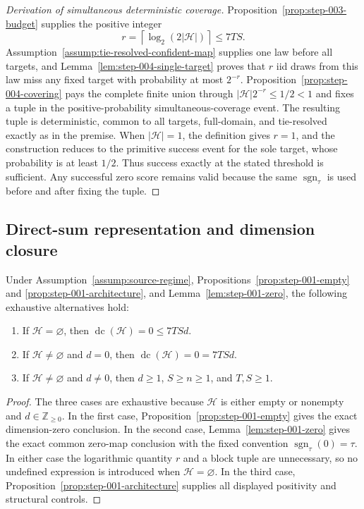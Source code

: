 \begin{proof}[Derivation of simultaneous deterministic coverage]
Proposition~\ref{prop:step-003-budget} supplies the positive integer
\[
r=\left\lceil\log_2(2|\mathcal H|)\right\rceil\leq7TS.
\]
Assumption~\ref{assump:tie-resolved-confident-map} supplies one law before all
targets, and Lemma~\ref{lem:step-004-single-target} proves that $r$ iid draws
from this law miss any fixed target with probability at most $2^{-r}$.
Proposition~\ref{prop:step-004-covering} pays the complete finite union through
$|\mathcal H|2^{-r}\leq1/2<1$ and fixes a tuple in the positive-probability
simultaneous-coverage event.  The resulting tuple is deterministic, common to
all targets, full-domain, and tie-resolved exactly as in the premise.
When $|\mathcal H|=1$, the definition gives $r=1$, and the construction
reduces to the primitive success event for the sole target, whose probability
is at least $1/2$.  Thus success exactly at the stated threshold is sufficient.
Any successful zero score remains valid because the same
$\operatorname{sgn}_{\tau}$ is used before and after fixing the tuple.
\end{proof}

\subsection{Direct-sum representation and dimension closure}
\label{app:step-005}

\begin{proposition}
\label{prop:step-005-routing}
Under Assumption~\ref{assump:source-regime},
Propositions~\ref{prop:step-001-empty} and
\ref{prop:step-001-architecture}, and Lemma~\ref{lem:step-001-zero}, the
following exhaustive alternatives hold:
\begin{enumerate}
\item If $\mathcal H=\varnothing$, then
$\operatorname{dc}(\mathcal H)=0\leq7TSd$.
\item If $\mathcal H\neq\varnothing$ and $d=0$, then
$\operatorname{dc}(\mathcal H)=0=7TSd$.
\item If $\mathcal H\neq\varnothing$ and $d\neq0$, then
$d\geq1$, $S\geq n\geq1$, and $T,S\geq1$.
\end{enumerate}
\end{proposition}

\begin{proof}
The three cases are exhaustive because $\mathcal H$ is either empty or
nonempty and $d\in\mathbb Z_{\geq0}$.  In the first case,
Proposition~\ref{prop:step-001-empty} gives the exact dimension-zero
conclusion.  In the second case, Lemma~\ref{lem:step-001-zero} gives the
exact common zero-map conclusion with the fixed convention
$\operatorname{sgn}_{\tau}(0)=\tau$.  In either case the logarithmic quantity
$r$ and a block tuple are unnecessary, so no undefined expression is
introduced when $\mathcal H=\varnothing$.  In the third case,
Proposition~\ref{prop:step-001-architecture} supplies all displayed
positivity and structural controls.
\end{proof}


